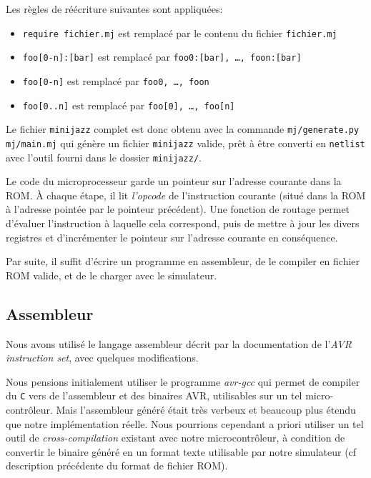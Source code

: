 \documentclass[11pt]{article}
\begin{document}
\pagebreak
Les règles de réécriture suivantes sont appliquées:
\begin{itemize}
    \item \texttt{require fichier.mj} est remplacé par le contenu du fichier \texttt{fichier.mj}
    \item \texttt{foo[0-n]:[bar]} est remplacé par \texttt{foo0:[bar], \dots, foon:[bar]}
    \item \texttt{foo[0-n]} est remplacé par \texttt{foo0, \dots, foon}
    \item \texttt{foo[0..n]} est remplacé par \texttt{foo[0], \dots, foo[n]}
\end{itemize}

Le fichier \texttt{minijazz} complet est donc obtenu avec la commande \texttt{mj/generate.py mj/main.mj} qui génère un fichier \texttt{minijazz} valide, prêt à être converti en \texttt{netlist} avec l'outil fourni dans le dossier \texttt{minijazz/}.

Le code du microprocesseur garde un pointeur sur l'adresse courante dans la ROM. À chaque étape, il lit \emph{l'opcode} de l'instruction courante (situé dans la ROM à l'adresse pointée par le pointeur précédent). Une fonction de routage permet d'évaluer l'instruction à laquelle cela correspond, puis de mettre à jour les divers registres et d'incrémenter le pointeur sur l'adresse courante en conséquence.

Par suite, il suffit d'écrire un programme en assembleur, de le compiler en fichier ROM valide, et de le charger avec le simulateur.

\subsection{Assembleur}

Nous avons utilisé le langage assembleur décrit par la documentation de l'\emph{AVR instruction set}, avec quelques modifications.

Nous pensions initialement utiliser le programme \emph{avr-gcc} qui permet de compiler du \texttt{C} vers de l'assembleur et des binaires AVR, utilisables sur un tel micro-contrôleur. Mais l'assembleur généré était très verbeux et beaucoup plus étendu que notre implémentation réelle. Nous pourrions cependant a priori utiliser un tel outil de \emph{cross-compilation} existant avec notre microcontrôleur, à condition de convertir le binaire généré en un format texte utilisable par notre simulateur (cf description précédente du format de fichier ROM).
\end{document}
